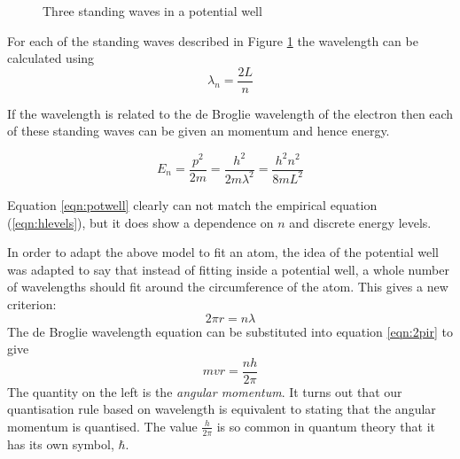 \documentclass[revision-guide.tex]{subfiles}
\begin{document}
\begin{figure}
  \begin{center}
  \end{center}
  \caption{Three standing waves in a potential well}
  \label{fig:potwell}
\end{figure}

For each of the standing waves described in Figure \ref{fig:potwell} the wavelength can be calculated using
\begin{equation}
  \lambda_n = \frac{2L}{n}
\end{equation}

If the wavelength is related to the de Broglie wavelength of the electron then each of these standing waves can be given an momentum and hence energy.

\begin{equation}\label{eqn:potwell}
  E_n = \frac{p^2}{2m} = \frac{h^2}{2m\lambda^2} = \frac{h^2n^2}{8mL^2}
\end{equation}

Equation \ref{eqn:potwell} clearly can not match the empirical equation (\ref{eqn:hlevels}), but it does show a dependence on $n$ and discrete energy levels.


In order to adapt the above model to fit an atom, the idea of the potential well was adapted to say that instead of fitting inside a potential well, a whole number of wavelengths should fit around the circumference of the atom. This gives a new criterion:
\begin{equation}\label{eqn:2pir}
  2\pi r = n\lambda
\end{equation}
The de Broglie wavelength equation can be substituted into equation \ref{eqn:2pir} to give
\begin{equation}\label{eqn:quanL}
  mvr = \frac{nh}{2\pi}
\end{equation}
The quantity on the left is the \emph{angular momentum}. It turns out that our quantisation rule based on wavelength is equivalent to stating that the angular momentum is quantised. The value $\frac{h}{2\pi}$ is so common in quantum theory that it has its own symbol, $\hbar$.
\end{document}
